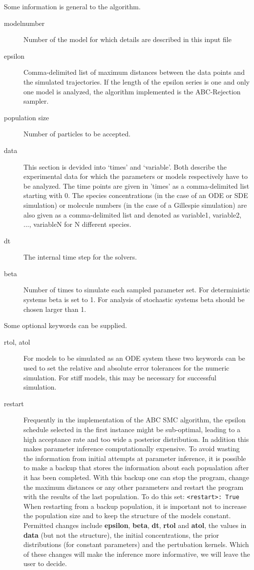 \documentclass[a4paper]{report}
\begin{document}
Some information is general to the algorithm.
\begin{description}
\item[modelnumber] Number of the model for which details are described in this input file
\item[epsilon] Comma-delimited list of maximum distances between the data points and the simulated trajectories. If the length of the epsilon series is one and only one model is analyzed, the algorithm implemented is the ABC-Rejection sampler.
\item[population size] Number of particles to be accepted.
\item[data] This section is devided into `times' and `variable'. Both describe the experimental data for which the parameters or models respectively have to be analyzed. The time points are given in 'times' as a comma-delimited list starting with 0. The species concentrations (in the case of an ODE or SDE simulation) or molecule numbers (in the case of a Gillespie simulation) are also given as a comma-delimited list and denoted as variable1, variable2, ..., variableN for N different species.
\item[dt] The internal time step for the solvers.
\item[beta] Number of times to simulate each sampled parameter set. For deterministic systems beta is set to 1. For analysis of stochastic systems beta should be chosen larger than 1.
\end{description}
Some optional keywords can be supplied.
\begin{description}
\item[rtol, atol] For models to be simulated as an ODE system these two keywords can be used to set the relative and absolute error tolerances for the numeric simulation. For stiff models, this may be necessary for successful simulation.
\item[restart] Frequently in the implementation of the ABC SMC algorithm, the epsilon schedule selected in the first instance might be sub-optimal, leading to a high acceptance rate and too wide a posterior distribution. In addition this makes parameter inference computationally expensive. To avoid wasting the information from initial attempts at parameter inference, it is possible to make a backup that stores the information about each popualation after it has been completed. With this backup one can stop the program, change the maximum distances or any other parameters and restart the program with the results of the last population. To do this set: \verb$<restart>: True$ When restarting from a backup population, it is important not to increase the population size and to keep the structure of the models constant. Permitted changes include \textbf{epsilon}, \textbf{beta}, \textbf{dt}, \textbf{rtol} and \textbf{atol}, the values in \textbf{data} (but not the structure), the initial concentrations, the prior distributions (for constant parameters) and the pertubation kernels. Which of these changes will make the inference more informative, we will leave the user to decide.\end{description}
\end{document}
